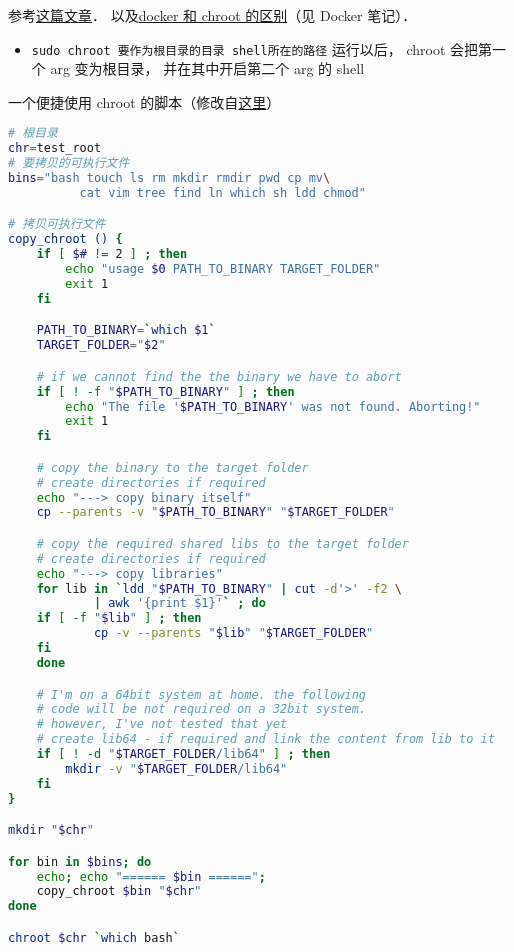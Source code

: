 
\begin{issues}
\issueDraft
\end{issues}

参考\href{https://www.howtogeek.com/441534/how-to-use-the-chroot-command-on-linux/}{这篇文章}．
以及\href{https://devops.stackexchange.com/questions/2826/difference-between-chroot-and-docker}{docker 和 chroot 的区别}（见 Docker 笔记）．

\begin{itemize}
\item \verb|sudo chroot 要作为根目录的目录 shell所在的路径| 运行以后， chroot 会把第一个 arg 变为根目录， 并在其中开启第二个 arg 的 shell
\end{itemize}

一个便捷使用 chroot 的脚本（修改自\href{https://gist.github.com/xmonader/5d1fc6134f1f65acd0d10f71453adb27}{这里}）

\begin{lstlisting}[language=bash]
# 根目录
chr=test_root
# 要拷贝的可执行文件
bins="bash touch ls rm mkdir rmdir pwd cp mv\
          cat vim tree find ln which sh ldd chmod"

# 拷贝可执行文件
copy_chroot () {
	if [ $# != 2 ] ; then
		echo "usage $0 PATH_TO_BINARY TARGET_FOLDER"
		exit 1
	fi

	PATH_TO_BINARY=`which $1`
	TARGET_FOLDER="$2"

	# if we cannot find the the binary we have to abort
	if [ ! -f "$PATH_TO_BINARY" ] ; then
		echo "The file '$PATH_TO_BINARY' was not found. Aborting!"
		exit 1
	fi

	# copy the binary to the target folder
	# create directories if required
	echo "---> copy binary itself"
	cp --parents -v "$PATH_TO_BINARY" "$TARGET_FOLDER"

	# copy the required shared libs to the target folder
	# create directories if required
	echo "---> copy libraries"
	for lib in `ldd "$PATH_TO_BINARY" | cut -d'>' -f2 \
            | awk '{print $1}'` ; do
	if [ -f "$lib" ] ; then
			cp -v --parents "$lib" "$TARGET_FOLDER"
	fi  
	done

	# I'm on a 64bit system at home. the following
    # code will be not required on a 32bit system.
	# however, I've not tested that yet
	# create lib64 - if required and link the content from lib to it
	if [ ! -d "$TARGET_FOLDER/lib64" ] ; then
		mkdir -v "$TARGET_FOLDER/lib64"
	fi
}

mkdir "$chr"

for bin in $bins; do
	echo; echo "====== $bin ======";
	copy_chroot $bin "$chr"
done

chroot $chr `which bash`
\end{lstlisting}
